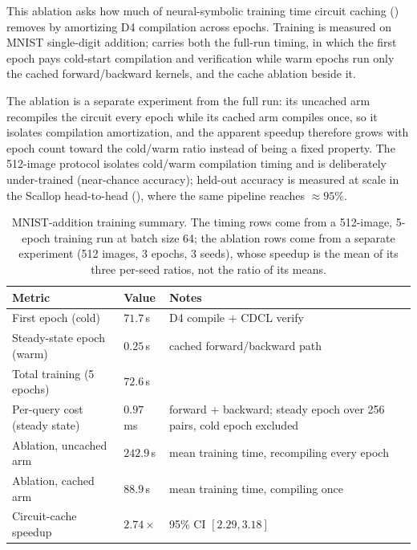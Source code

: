 This ablation asks how much of neural-symbolic training time circuit caching () removes by amortizing D4 compilation across epochs. Training is measured on MNIST single-digit addition;  carries both the full-run timing, in which the first epoch pays cold-start compilation and verification while warm epochs run only the cached forward/backward kernels, and the cache ablation beside it.

The ablation is a separate experiment from the full run: its uncached arm recompiles the circuit every epoch while its cached arm compiles once, so it isolates compilation amortization, and the apparent speedup therefore grows with epoch count toward the cold/warm ratio instead of being a fixed property. The 512-image protocol isolates cold/warm compilation timing and is deliberately under-trained (near-chance accuracy); held-out accuracy is measured at scale in the Scallop head-to-head (), where the same pipeline reaches ${\approx}95\%$.

\begin{table}[htbp]
  \centering
  \caption{MNIST-addition training summary. The timing rows come from a 512-image, 5-epoch training run at batch size 64; the ablation rows come from a separate experiment (512 images, 3 epochs, 3 seeds), whose speedup is the mean of its three per-seed ratios, not the ratio of its means.}
  \label{tab:training-summary}
  \small
  \begin{tabularx}{\linewidth}{@{}l l L@{}}
    \toprule
    \textbf{Metric} & \textbf{Value} & \textbf{Notes} \\
    \midrule
    First epoch (cold)         & $71.7$\,s  & D4 compile + CDCL verify \\
    Steady-state epoch (warm)  & $0.25$\,s  & cached forward/backward path \\
    Total training (5 epochs)  & $72.6$\,s  & \\
    Per-query cost (steady state) & $0.97$\,ms & forward + backward; steady epoch over 256 pairs, cold epoch excluded \\
    \addlinespace
    Ablation, uncached arm     & $242.9$\,s & mean training time, recompiling every epoch \\
    Ablation, cached arm       & $88.9$\,s  & mean training time, compiling once \\
    Circuit-cache speedup      & $2.74\times$ & 95\% CI $[2.29, 3.18]$ \\
    \bottomrule
  \end{tabularx}
\end{table}

